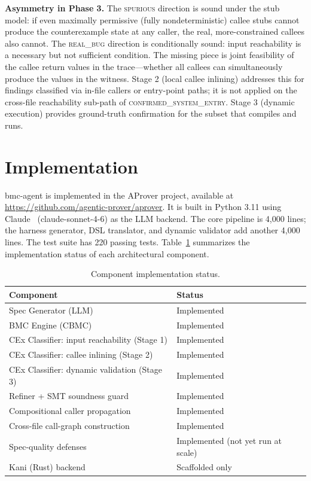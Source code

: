 \documentclass[11pt,a4paper]{article}
\newcommand{\tool}{bmc-agent\xspace}
\newcommand{\sysconf}{\textsc{confirmed\_system\_entry}\xspace}
\begin{document}
\smallskip\noindent\textbf{Asymmetry in Phase 3.}
The \textsc{spurious} direction is sound under the stub model: if even
maximally permissive (fully nondeterministic) callee stubs cannot produce the
counterexample state at any caller, the real, more-constrained callees also
cannot. The \textsc{real\_bug} direction is conditionally sound: input
reachability is a necessary but not sufficient condition. The missing piece
is joint feasibility of the callee return values in the trace---whether all
callees can simultaneously produce the values in the witness. Stage 2 (local callee inlining) addresses this for findings classified via
in-file callers or entry-point paths; it is not applied on the cross-file
reachability sub-path of \sysconf{}. Stage 3 (dynamic execution) provides
ground-truth confirmation for the subset that compiles and runs.

\section{Implementation}
\label{sec:impl}

\tool is implemented in the AProver project, available at
\url{https://github.com/agentic-prover/aprover}. It is built in Python 3.11
using Claude~\cite{anthropic-claude} (claude-sonnet-4-6) as the LLM backend. The core pipeline is 4{,}000 lines; the harness generator,
DSL translator, and dynamic validator add another 4{,}000 lines. The test
suite has 220 passing tests. Table~\ref{tab:components}
summarizes the implementation status of each architectural component.

\begin{table}[t]
\caption{Component implementation status.}
\label{tab:components}
\small
\begin{tabular}{ll}
\toprule
\textbf{Component} & \textbf{Status} \\
\midrule
Spec Generator (LLM)              & Implemented \\
BMC Engine (CBMC)                 & Implemented \\
CEx Classifier: input reachability (Stage 1) & Implemented \\
CEx Classifier: callee inlining (Stage 2)    & Implemented \\
CEx Classifier: dynamic validation (Stage 3) & Implemented \\
Refiner + SMT soundness guard     & Implemented \\
Compositional caller propagation  & Implemented \\
Cross-file call-graph construction& Implemented \\
Spec-quality defenses             & Implemented (not yet run at scale) \\
Kani (Rust) backend               & Scaffolded only \\
\bottomrule
\end{tabular}
\end{table}
\end{document}
